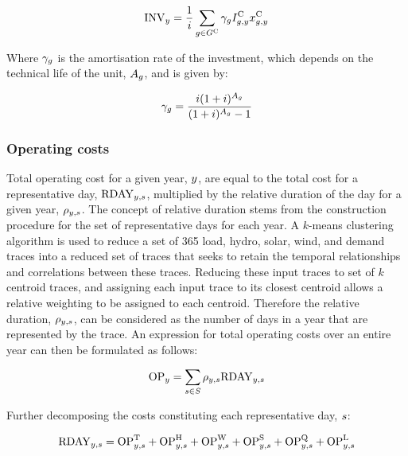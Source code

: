 \documentclass{article}
\begin{document}
\begin{equation}
\cInvestmentCost = \frac{1}{\cInterestRate}\sum\limits_{g\in \sGeneratorsCandidate} \cAmortisationRate  \cCandidateInvestmentCost \vInstalledCapacity
\end{equation}

Where $\cAmortisationRate$ is the amortisation rate of the investment, which depends on the technical life of the unit, $\cAssetLifetime$, and is given by:

\begin{equation}
\cAmortisationRate = \frac{\cInterestRate(1+\cInterestRate)^{\cAssetLifetime}}{(1+\cInterestRate)^{\cAssetLifetime} - 1}
\end{equation}


\subsubsection{Operating costs}

Total operating cost for a given year, $\iYear$, are equal to the total cost for a representative day, $\cOperatingCostScenario$, multiplied by the relative duration of the day for a given year, $\cScenarioDuration$. The concept of relative duration stems from the construction procedure for the set of representative days for each year. A $k$-means clustering algorithm is used to reduce a set of 365 load, hydro, solar, wind, and demand traces into a reduced set of traces that seeks to retain the temporal relationships and correlations between these traces. Reducing these input traces to set of $k$ centroid traces, and assigning each input trace to its closest centroid allows a relative weighting to be assigned to each centroid. Therefore the relative duration, $\cScenarioDuration$, can be considered as the number of days in a year that are represented by the trace. An expression for total operating costs over an entire year can then be formulated as follows:

\begin{equation}
\cOperatingCost[\iYear] = \sum\limits_{\iScenario \in \sScenarios} \cScenarioDuration \cOperatingCostScenario
\end{equation}

Further decomposing the costs constituting each representative day, $\iScenario$:

\begin{equation}
\cOperatingCostScenario = \cOperatingCostThermal + \cOperatingCostHydro + \cOperatingCostWind + \cOperatingCostSolar + \cOperatingCostStorage + \cOperatingCostLostLoad
\end{equation}
\end{document}
